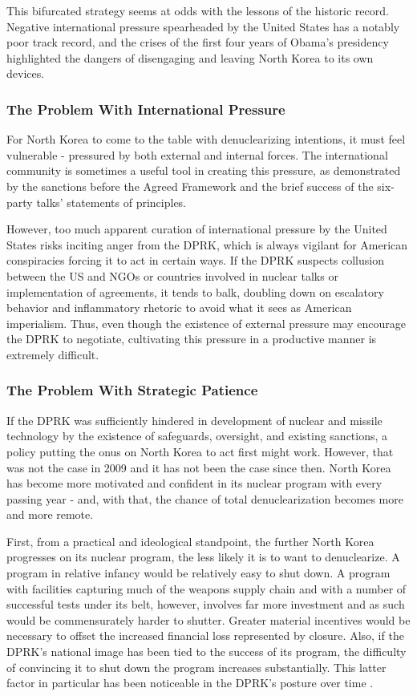 \documentclass{article}
\begin{document}
This bifurcated strategy seems at odds with the lessons of the historic record. Negative international pressure spearheaded by the United States has a notably poor track record, and the crises of the first four years of Obama's presidency highlighted the dangers of disengaging and leaving North Korea to its own devices.

\subsubsection{The Problem With International Pressure}

For North Korea to come to the table with denuclearizing intentions, it must feel vulnerable - pressured by both external and internal forces. The international community is sometimes a useful tool in creating this pressure, as demonstrated by the sanctions before the Agreed Framework and the brief success of the six-party talks' statements of principles. 

However, too much apparent curation of international pressure by the United States risks inciting anger from the DPRK, which is always vigilant for American conspiracies forcing it to act in certain ways. If the DPRK suspects collusion between the US and NGOs or countries involved in nuclear talks or implementation of agreements, it tends to balk, doubling down on escalatory behavior and inflammatory rhetoric to avoid what it sees as American imperialism. Thus, even though the existence of external pressure may encourage the DPRK to negotiate, cultivating this pressure in a productive manner is extremely difficult.

\subsubsection{The Problem With Strategic Patience}

If the DPRK was sufficiently hindered in development of nuclear and missile technology by the existence of safeguards, oversight, and existing sanctions, a policy putting the onus on North Korea to act first might work. However, that was not the case in 2009 and it has not been the case since then. North Korea has become more motivated and confident in its nuclear program with every passing year - and, with that, the chance of total denuclearization becomes more and more remote.

First, from a practical and ideological standpoint, the further North Korea progresses on its nuclear program, the less likely it is to want to denuclearize. A program in relative infancy would be relatively easy to shut down. A program with facilities capturing much of the weapons supply chain and with a number of successful tests under its belt, however, involves far more investment and as such would be commensurately harder to shutter. Greater material incentives would be necessary to offset the increased financial loss represented by closure. Also, if the DPRK's national image has been tied to the success of its program, the difficulty of convincing it to shut down the program increases substantially. This latter factor in particular has been noticeable in the DPRK's posture over time \cite{rich14,hecker2}.
\end{document}
